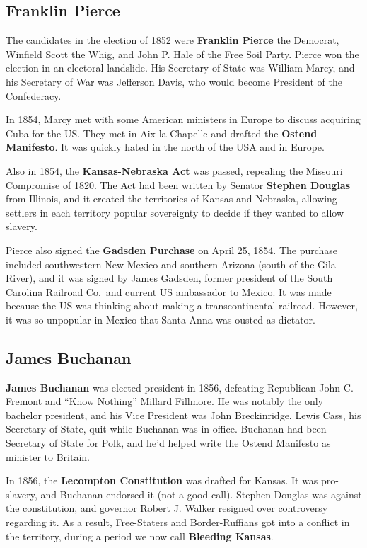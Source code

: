 \subsection*{Franklin Pierce}

The candidates in the election of 1852 were
\textbf{Franklin Pierce} the Democrat,
Winfield Scott the Whig,
and John P. Hale of the Free Soil Party.
Pierce won the election in an electoral landslide.
His Secretary of State was William Marcy,
and his Secretary of War was Jefferson Davis, who would become President of the Confederacy.

In 1854, Marcy met with some American ministers in Europe to discuss acquiring Cuba for the US\@.
They met in Aix-la-Chapelle and drafted the \textbf{Ostend Manifesto}.
It was quickly hated in the north of the USA and in Europe.

Also in 1854, the \textbf{Kansas-Nebraska Act} was passed, repealing the Missouri Compromise of 1820.
The Act had been written by Senator \textbf{Stephen Douglas} from Illinois,
and it created the territories of Kansas and Nebraska,
allowing settlers in each territory popular sovereignty to decide if they wanted to allow slavery.

Pierce also signed the \textbf{Gadsden Purchase} on April 25, 1854.
The purchase included southwestern New Mexico and southern Arizona (south of the Gila River),
and it was signed by James Gadsden,
former president of the South Carolina Railroad Co.\ and current US ambassador to Mexico.
It was made because the US was thinking about making a transcontinental railroad.
However, it was so unpopular in Mexico that Santa Anna was ousted as dictator.

\subsection*{James Buchanan}

\textbf{James Buchanan} was elected president in 1856,
defeating Republican John C. Fremont and ``Know Nothing'' Millard Fillmore.
He was notably the only bachelor president, and his Vice President was John Breckinridge.
Lewis Cass, his Secretary of State, quit while Buchanan was in office.
Buchanan had been Secretary of State for Polk,
and he'd helped write the Ostend Manifesto as minister to Britain.

In 1856, the \textbf{Lecompton Constitution} was drafted for Kansas.
It was pro-slavery, and Buchanan endorsed it (not a good call).
Stephen Douglas was against the constitution,
and governor Robert J. Walker resigned over controversy regarding it.
As a result, Free-Staters and Border-Ruffians got into a conflict in the territory,
during a period we now call \textbf{Bleeding Kansas}.

